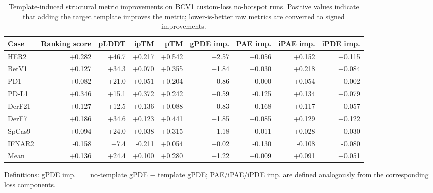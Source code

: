\begin{table}[htbp]
\centering
\small
\caption{Template-induced structural metric improvements on BCV1 custom-loss no-hotspot runs. Positive values indicate that adding the target template improves the metric; lower-is-better raw metrics are converted to signed improvements.}
\label{tab:bcv1_template_structural_metrics}
\begin{tabular}{lrrrrrrrr}
\toprule
Case & Ranking score & pLDDT & ipTM & pTM & gPDE imp. & PAE imp. & iPAE imp. & iPDE imp. \\
\midrule
HER2 & +0.282 & +46.7 & +0.217 & +0.542 & +2.57 & +0.056 & +0.152 & +0.115 \\
BetV1 & +0.127 & +34.3 & +0.070 & +0.355 & +1.84 & +0.030 & +0.218 & +0.084 \\
PD1 & +0.082 & +21.0 & +0.051 & +0.204 & +0.86 & -0.000 & +0.054 & -0.002 \\
PD-L1 & +0.346 & +15.1 & +0.372 & +0.242 & +0.59 & -0.125 & +0.134 & +0.079 \\
DerF21 & +0.127 & +12.5 & +0.136 & +0.088 & +0.83 & +0.168 & +0.117 & +0.057 \\
DerF7 & +0.186 & +34.6 & +0.123 & +0.441 & +1.85 & +0.085 & +0.129 & +0.122 \\
SpCas9 & +0.094 & +24.0 & +0.038 & +0.315 & +1.18 & -0.011 & +0.028 & +0.030 \\
IFNAR2 & -0.158 & +7.4 & -0.211 & +0.054 & +0.02 & -0.130 & -0.108 & -0.080 \\
\midrule
Mean & +0.136 & +24.4 & +0.100 & +0.280 & +1.22 & +0.009 & +0.091 & +0.051 \\
\bottomrule
\end{tabular}

\vspace{0.4em}
\footnotesize{Definitions: gPDE imp. $=$ no-template gPDE $-$ template gPDE; PAE/iPAE/iPDE imp. are defined analogously from the corresponding loss components.}
\end{table}
